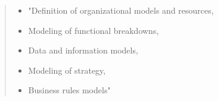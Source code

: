 \begin{quote}

\begin{itemize}
\item "Definition of organizational models and resources,
\item Modeling of functional breakdowns,
\item Data and information models,
\item Modeling of strategy,
\item Business rules models"
\end{itemize}

\end{quote}


